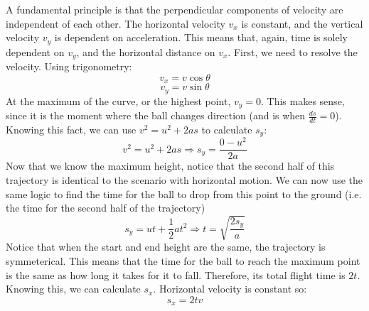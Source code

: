 \documentclass[11pt]{article}
\begin{document}
A fundamental principle is that the perpendicular components of velocity are independent of each other. The horizontal velocity $v_{x}$ is constant, and the vertical velocity $v_{y}$ is dependent on acceleration. This means that, again, time is solely dependent on $v_{y}$, and the horizontal distance on $v_{x}$. First, we need to resolve the velocity. Using trigonometry:
\[v_{x}=v\cos\theta\]
\[v_{y}=v\sin\theta\]
At the maximum of the curve, or the highest point, $v_{y}=0$. This makes sense, since it is the moment where the ball changes direction (and is when $\frac{ds}{dt}=0$). Knowing this fact, we can use $v^{2}=u^{2}+2as$ to calculate $s_{y}$:
\[v^{2}=u^{2}+2as \Rightarrow s_{y}=\frac{0-u^{2}}{2a}\]
Now that we know the maximum height, notice that the second half of this trajectory is identical to the scenario with horizontal motion. We can now use the same logic to find the time for the ball to drop from this point to the ground (i.e. the time for the second half of the trajectory)
\[s_{y}=ut+\frac{1}{2}at^{2} \Rightarrow t=\sqrt{\frac{2s_{y}}{a}}\]
Notice that when the start and end height are the same, the trajectory is symmeterical. This means that the time for the ball to reach the maximum point is the same as how long it takes for it to fall. Therefore, its total flight time is $2t$. Knowing this, we can calculate $s_{x}$. Horizontal velocity is constant so:
\[s_{x}=2tv\]
\end{document}
